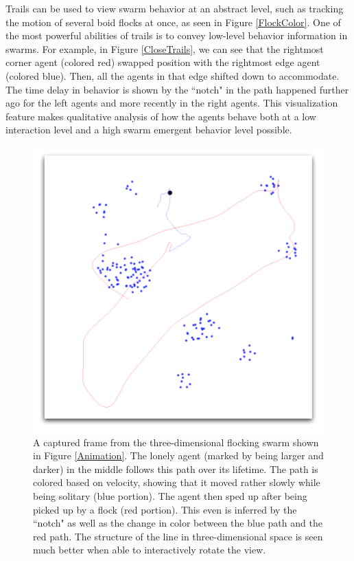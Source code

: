 \documentclass[conference]{IEEEtran}
\begin{document}
Trails can be used to view swarm behavior at an abstract level, such as tracking the motion of several boid
flocks at once, as seen in Figure \ref{FlockColor}.
One of the most powerful abilities of trails is to convey low-level behavior information in swarms. For example,
in Figure \ref{CloseTrails}, we can see that the rightmost corner agent (colored red) swapped position with the rightmost
edge agent (colored blue). Then, all the agents in that edge shifted down to accommodate.
The time delay in behavior is shown by the ``notch" in the path happened further ago for the left agents and more recently
in the right agents.
This visualization feature makes qualitative analysis of how the agents behave both at a low interaction level
and a high swarm emergent behavior level possible.







\begin{figure}
\centering
\includegraphics[scale=.4]{images/track.pdf}
\caption{
A captured frame from the three-dimensional flocking swarm shown in Figure \ref{Animation}.
The lonely agent (marked by being larger and darker) in the middle follows this path over its lifetime.
The path is colored based on velocity, showing that it moved rather slowly while being solitary (blue portion).
The agent then sped up after being picked up by a flock (red portion). This even is inferred by the ``notch"
as well as the change in color between the blue path and the red path.
The structure of the line in three-dimensional space
is seen much better when able to interactively rotate the view.}
\label{Track}
\end{figure}
\end{document}

